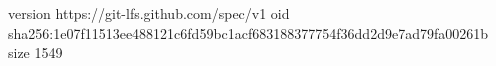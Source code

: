 version https://git-lfs.github.com/spec/v1
oid sha256:1e07f11513ee488121c6fd59bc1acf683188377754f36dd2d9e7ad79fa00261b
size 1549
